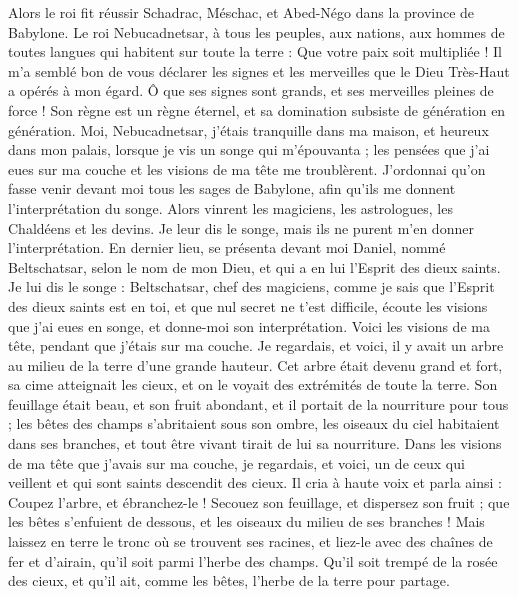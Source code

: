 \begin{multicols}{2}
Alors le roi fit réussir Schadrac, Méschac, et Abed-Négo dans la province de Babylone.
\VerseOne{}Le roi Nebucadnetsar, à tous les peuples, aux nations, aux hommes de toutes langues qui habitent sur toute la terre : Que votre paix soit multipliée !
Il m'a semblé bon de vous déclarer les signes et les merveilles que le Dieu Très-Haut a opérés à mon égard.
Ô que ses signes sont grands, et ses merveilles pleines de force ! Son règne est un règne éternel, et sa domination subsiste de génération en génération.
Moi, Nebucadnetsar, j'étais tranquille dans ma maison, et heureux dans mon palais,
lorsque je vis un songe qui m'épouvanta ; les pensées que j'ai eues sur ma couche et les visions de ma tête me troublèrent.
J'ordonnai qu'on fasse venir devant moi tous les sages de Babylone, afin qu'ils me donnent l'interprétation du songe.
Alors vinrent les magiciens, les astrologues, les Chaldéens et les devins. Je leur dis le songe, mais ils ne purent m'en donner l'interprétation.
En dernier lieu, se présenta devant moi Daniel, nommé Beltschatsar, selon le nom de mon Dieu, et qui a en lui l'Esprit des dieux saints. Je lui dis le songe :
Beltschatsar, chef des magiciens, comme je sais que l'Esprit des dieux saints est en toi, et que nul secret ne t'est difficile, écoute les visions que j'ai eues en songe, et donne-moi son interprétation.
Voici les visions de ma tête, pendant que j'étais sur ma couche. Je regardais, et voici, il y avait un arbre au milieu de la terre d'une grande hauteur.
Cet arbre était devenu grand et fort, sa cime atteignait les cieux, et on le voyait des extrémités de toute la terre.
Son feuillage était beau, et son fruit abondant, et il portait de la nourriture pour tous ; les bêtes des champs s'abritaient sous son ombre, les oiseaux du ciel habitaient dans ses branches, et tout être vivant tirait de lui sa nourriture.
Dans les visions de ma tête que j'avais sur ma couche, je regardais, et voici, un de ceux qui veillent et qui sont saints descendit des cieux.
Il cria à haute voix et parla ainsi : Coupez l'arbre, et ébranchez-le ! Secouez son feuillage, et dispersez son fruit ; que les bêtes s'enfuient de dessous, et les oiseaux du milieu de ses branches !
Mais laissez en terre le tronc où se trouvent ses racines, et liez-le avec des chaînes de fer et d'airain, qu'il soit parmi l'herbe des champs. Qu'il soit trempé de la rosée des cieux, et qu'il ait, comme les bêtes, l'herbe de la terre pour partage.

\end{multicols}
